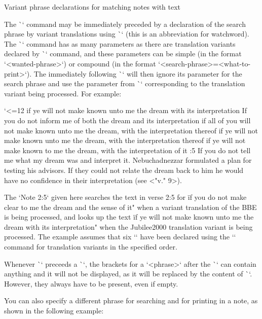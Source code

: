 \secc[ww] Variant phrase declarations for matching notes with text

The \`\Note` command may be immediately preceded by a declaration of the search
phrase by variant translations using \`\ww` (this is an abbreviation for watchword).
The \`\ww` command has as many parameters as there are translation variants declared by
\`\variants` command, and these parameters can be simple (in the format
`{<wanted-phrase>}`) or compound (in the format
`{<search-phrase>}={<what-to-print>}`). The immediately following \`\Note`
will then ignore its parameter for the search phrase and use the parameter from \`\ww`
corresponding to the translation variant being processed. For example:

\begtt \typosize[8/11] \catcode`<=12
    {if ye will not make known unto me the dream with its interpretation} %
    {If you do not inform me of both the dream and its interpretation} %
    {if all of you will not make known unto me the dream, with the interpretation thereof} %
    {if ye will not make known unto me the dream, with the interpretation thereof} %
    {if ye will not make known to me the dream, with the interpretation of it} %
:5 {If you do not tell me what my dream was and interpret it.}
    Nebuchadnezzar formulated a plan for testing his advisors. If they could not relate the dream back 
    to him he would have no confidence in their interpretation (see <"v." 9>). 
\endtt

The `Note 2:5` given here searches the text in verse 2:5 for \"if you do not make clear to me the 
dream and the sense of it" when a variant translation of the BBE is being processed, and looks up 
the text \"if ye will not make known unto me the dream with its interpretation" when the Jubilee2000 
translation variant is being processed.
The example assumes that six `\variants` have been declared using the 
`\variants` command for translation variants in the specified order. 

Whenever \`\ww` preceeds a \`\Note`, the brackets for a `{<phrase>}` after the \`\Note` can contain anything and it will not be displayed, as it will be replaced by the content of \`\ww`. However, they always have to be present, even if empty.

You can also specify a different phrase
for searching and for printing in a note, as shown in the following example:


